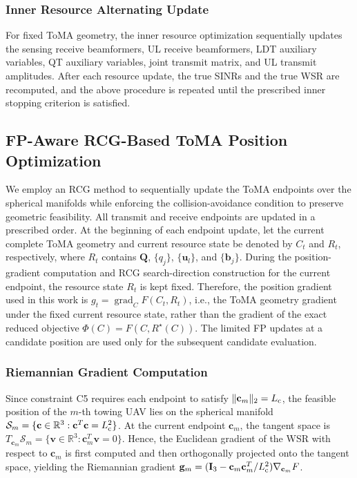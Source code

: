 \documentclass[letterpaper,journal]{IEEEtran}
\begin{document}
\subsubsection{Inner Resource Alternating Update}

For fixed ToMA geometry, the inner resource optimization sequentially updates the sensing receive beamformers, UL receive beamformers, LDT auxiliary variables, QT auxiliary variables, joint transmit matrix, and UL transmit amplitudes. After each resource update, the true SINRs and the true WSR are recomputed, and the above procedure is repeated until the prescribed inner stopping criterion is satisfied.

\subsection{FP-Aware RCG-Based ToMA Position Optimization}
\label{subsec:fpaware_rcg}

We employ an RCG method to sequentially update the ToMA endpoints over the spherical manifolds while enforcing the collision-avoidance condition to preserve geometric feasibility. All transmit and receive endpoints are updated in a prescribed order. At the beginning of each endpoint update, let the current complete ToMA geometry and current resource state be denoted by $C_t$ and $R_t$, respectively, where $R_t$ contains $\mathbf Q$, $\{q_j\}$, $\{\mathbf u_l\}$, and $\{\mathbf b_j\}$. During the position-gradient computation and RCG search-direction construction for the current endpoint, the resource state $R_t$ is kept fixed. Therefore, the position gradient used in this work is $g_t=\operatorname{grad}_{C}F(C_t,R_t)$, i.e., the ToMA geometry gradient under the fixed current resource state, rather than the gradient of the exact reduced objective $\Phi(C)=F(C,R^\star(C))$. The limited FP updates at a candidate position are used only for the subsequent candidate evaluation.

\subsubsection{Riemannian Gradient Computation}

Since constraint C5 requires each endpoint to satisfy $\|\mathbf c_m\|_2=L_{\rm c}$, the feasible position of the $m$-th towing UAV lies on the spherical manifold $\mathcal S_m=\{\mathbf c\in\mathbb R^3:\mathbf c^T\mathbf c=L_{\rm c}^2\}$. At the current endpoint $\mathbf c_m$, the tangent space is $T_{\mathbf c_m}\mathcal S_m=\{\mathbf v\in\mathbb R^3:\mathbf c_m^T\mathbf v=0\}$. Hence, the Euclidean gradient of the WSR with respect to $\mathbf c_m$ is first computed and then orthogonally projected onto the tangent space, yielding the Riemannian gradient $\mathbf g_m=(\mathbf I_3-\mathbf c_m\mathbf c_m^T/L_{\rm c}^2)\nabla_{\mathbf c_m}F$.
\end{document}

